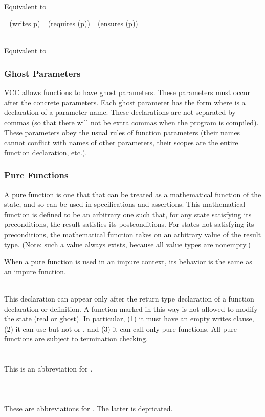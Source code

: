 \documentclass[preprint,nocopyrightspace]{sigplanconf}
\begin{document}
{{{\\
Equivalent to
\begin{VCC}
  _(writes p)
  _(requires \mutable(p))
  _(ensures \mutable(p))
\end{VCC}

\\
Equivalent to 


\subsubsection{Ghost Parameters}

VCC allows functions to have ghost parameters. These parameters must
occur after the concrete parameters. Each ghost parameter has the
form  where  is a declaration of a
parameter name. These declarations are not separated by commas (so
that there will not be extra commas when the program is
compiled). These parameters obey the usual rules of function
parameters (their names cannot conflict with names of other
parameters, their scopes are the entire function declaration, etc.).

\subsubsection{Pure Functions}
A pure function is one that that can be treated as a mathematical
function of the state, and so can be used in specifications and
assertions. This mathematical function is defined to be an arbitrary
one such that, for any state satisfying its preconditions, the result
satisfies its postconditions. For states not satisfying its
preconditions, the mathematical function takes on an arbitrary value
of the result type. (Note: such a value always exists, because all
value types are nonempty.)

When a pure function is used in an impure context, its
behavior is the same as an impure function. 

\\
This declaration can appear only after the return type declaration of
a function declaration or definition. A function marked in this way is
not allowed to modify the state (real or ghost). In particular, (1) it
must have an empty writes clause, (2) it can use 
but not  or , and (3) it can call
only pure functions. All pure functions are subject to termination
checking. 
\\\\
\\
This is an abbreviation for 
.
\\\\
\\
\\
These are abbreviations for . The latter
is depricated.

}}}
\end{document}
